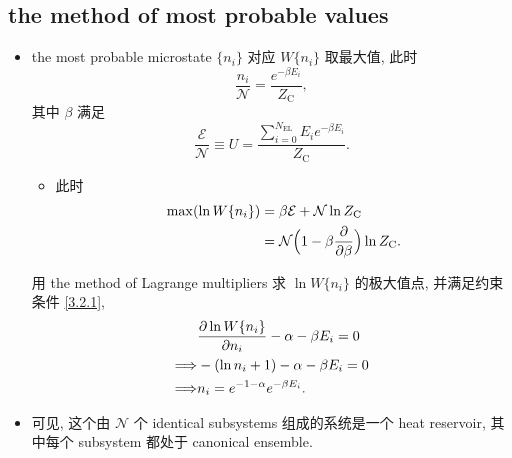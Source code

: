 \subsection{the method of most probable values}
\begin{itemize}
	\item the most probable microstate $\{n_i\}$ 对应 $W\{n_i\}$ 取最大值, 此时
	\begin{equation}
		\frac{n_i}{\mathcal{N}} = \frac{e^{- \beta E_i}}{Z_\text{C}},
	\end{equation}
	其中 $\beta$ 满足
	\begin{equation} \label{3.2.5}
		\frac{\mathcal{E}}{\mathcal{N}} \equiv U = \frac{\sum_{i = 0}^{N_\text{EL}} E_i e^{- \beta E_i}}{Z_\text{C}}.
	\end{equation}
	\begin{itemize}
		\item 此时
		\begin{align}
			\max(\ln W\{n_i\}) &= \beta \mathcal{E} + \mathcal{N} \ln Z_\text{C} \notag \\
			&= \mathcal{N} \Big( 1 - \beta \frac{\partial}{\partial \beta} \Big) \ln Z_\text{C}.
		\end{align}
	\end{itemize}
	
	\begin{tcolorbox}[title=proof:]
		用 the method of Lagrange multipliers 求 $\ln W\{n_i\}$ 的极大值点, 并满足约束条件 \eqref{3.2.1},
		\begin{align}
			& \frac{\partial \ln W\{n_i\}}{\partial n_i} - \alpha - \beta E_i = 0 \notag \\
			\Longrightarrow & - (\ln n_i + 1) - \alpha - \beta E_i = 0 \notag \\
			\Longrightarrow & n_i = e^{- 1 - \alpha} e^{- \beta E_i}.
		\end{align}
	\end{tcolorbox}
	
	\item 可见, 这个由 $\mathcal{N}$ 个 identical subsystems 组成的系统是一个 heat reservoir, 其中每个 subsystem 都处于 canonical ensemble.
\end{itemize}

